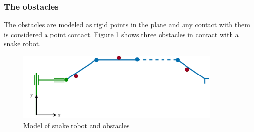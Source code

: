 

\subsubsection{The obstacles}

The obstacles are modeled as rigid points in the plane and any contact with them is considered a point contact. Figure \ref{fig:2_kin_obst} shows three obstacles in contact with a snake robot.

\begin{figure}[h!]
    \centering
    \includegraphics[width=0.9\textwidth]{figures/modelspecs/superbasicsnakenobstacles.pdf}
    \caption{Model of snake robot and obstacles}
    \label{fig:2_kin_obst}
\end{figure}








